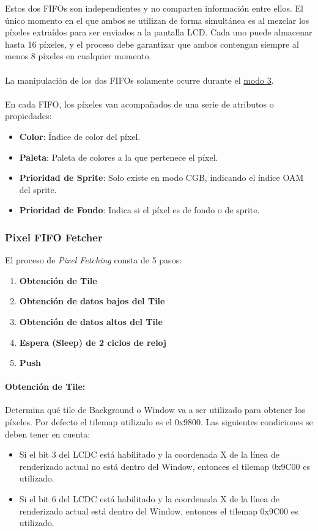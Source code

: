 Estos dos FIFOs son independientes y no comparten información entre ellos. El único momento en el que ambos se utilizan de forma simultánea es al mezclar los píxeles extraídos para ser enviados a la pantalla LCD. Cada uno puede almacenar hasta 16 píxeles, y el proceso debe garantizar que ambos contengan siempre al menos 8 píxeles en cualquier momento.
\\\\
La manipulación de los dos FIFOs solamente ocurre durante el \hyperref[ppu:mode3]{modo 3}.
\\\\
En cada FIFO, los píxeles van acompañados de una serie de atributos o propiedades:
\begin{itemize}
    \item \textbf{Color}: Índice de color del píxel.
    \item \textbf{Paleta}: Paleta de colores a la que pertenece el píxel.
    \item \textbf{Prioridad de Sprite}: Solo existe en modo CGB, indicando el índice OAM del sprite.
    \item \textbf{Prioridad de Fondo}: Indica si el píxel es de fondo o de sprite.
\end{itemize}

\subsubsection{Pixel FIFO Fetcher}

El proceso de \textit{Pixel Fetching} consta de 5 pasos:

\begin{enumerate}
    \item \textbf{Obtención de Tile}
    \item \textbf{Obtención de datos bajos del Tile}
    \item \textbf{Obtención de datos altos del Tile}
    \item \textbf{Espera (Sleep) de 2 ciclos de reloj}
    \item \textbf{Push}
\end{enumerate}

\paragraph{Obtención de Tile:} Determina qué tile de Background o Window va a ser utilizado para obtener los píxeles. Por defecto el tilemap utilizado es el 0x9800. Las siguientes condiciones se deben tener en cuenta:
\begin{itemize}
    \item Si el bit 3 del LCDC está habilitado y la coordenada X de la línea de renderizado actual no está dentro del Window, entonces el tilemap 0x9C00 es utilizado.
    \item Si el bit 6 del LCDC está habilitado y la coordenada X de la línea de renderizado actual está dentro del Window, entonces el tilemap 0x9C00 es utilizado.
\end{itemize}

